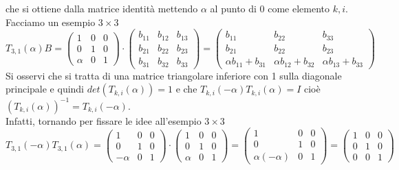 che si ottiene dalla matrice identità mettendo $\alpha$ al punto di 0 come elemento $k,i$.\\Facciamo un esempio $3\times 3$
\begin{equation*}
    T_{3,1}(\alpha)B=
    \begin{pmatrix}
        1 & 0 & 0 \\
        0 & 1 & 0 \\
        \alpha & 0 & 1
    \end{pmatrix} \cdot \begin{pmatrix}
        b_{11} & b_{12} & b_{13} \\
        b_{21} & b_{22} & b_{23} \\
        b_{31} & b_{32} & b_{33}
    \end{pmatrix}=\begin{pmatrix}
        b_{11} & b_{22} & b_{33} \\
        b_{21} & b_{22} & b_{23} \\
        \alpha b_{11}+b_{31} & \alpha b_{12}+b_{32} & \alpha b_{13}+b_{33}
    \end{pmatrix}
\end{equation*}
Si osservi che si tratta di una matrice triangolare inferiore con 1 sulla diagonale principale e quindi $det(T_{k,i}(\alpha))=1$ e che $T_{k,i}(-\alpha)T_{k,i}(\alpha)= I$ cioè $(T_{k,i}(\alpha))^{-1}=T_{k,i}(-\alpha)$.\\Infatti, tornando per fissare le idee all'esempio $3\times 3$
\begin{equation*}
    T_{3,1}(-\alpha)T_{3,1}(\alpha)=
    \begin{pmatrix}
        1 & 0 & 0 \\
        0 & 1 & 0 \\
        -\alpha & 0 & 1
    \end{pmatrix} \cdot \begin{pmatrix}
        1 & 0 & 0 \\
        0 & 1 & 0 \\
        \alpha & 0 & 1
    \end{pmatrix}=\begin{pmatrix}
        1 & 0 & 0 \\
        0 & 1 & 0 \\
        \alpha(-\alpha) & 0 & 1
    \end{pmatrix}=\begin{pmatrix}
        1 & 0 & 0 \\
        0 & 1 & 0 \\
        0 & 0 & 1
    \end{pmatrix}
\end{equation*}
